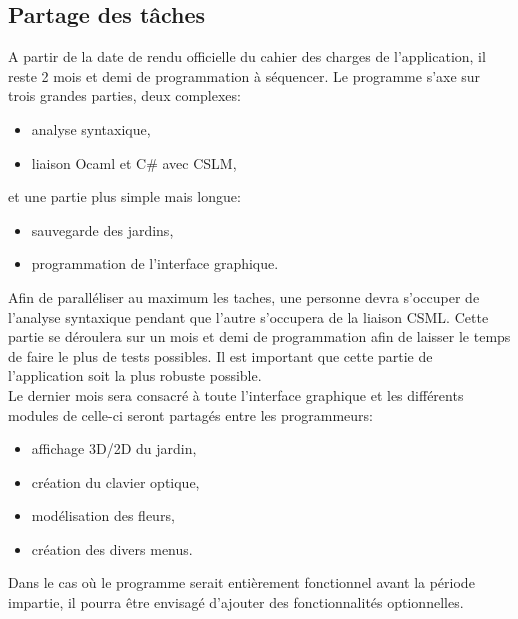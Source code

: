 \documentclass{article}
\theoremstyle{plain}
\theoremstyle{remark}
\begin{document}
\subsection{Partage des tâches}
A partir de la date de rendu officielle du cahier des charges de
l'application, il reste 2 mois et demi de programmation à séquencer.
\noindent
Le programme s'axe sur trois grandes parties, deux complexes:
\begin{itemize}
\item analyse syntaxique,
\item liaison Ocaml et C\# avec CSLM,
\end{itemize}
\noindent
et une partie plus simple mais longue:
\begin{itemize}
\item sauvegarde des jardins,
\item programmation de l'interface graphique.
\end{itemize}

Afin de paralléliser au maximum les taches, une personne devra
s'occuper de l'analyse syntaxique pendant que l'autre s'occupera de la
liaison CSML.  Cette partie se déroulera sur un mois et demi de
programmation afin de laisser le temps de faire le plus de tests
possibles. Il est important que cette partie de l'application soit la
plus robuste possible.\\ Le dernier mois sera consacré à toute
l'interface graphique et les différents modules de celle-ci seront
partagés entre les programmeurs:
\begin{itemize}
\item affichage 3D/2D du jardin,
\item création du clavier optique,
\item modélisation des fleurs,
\item création des divers menus.
\end{itemize}
\noindent
Dans le cas où le programme serait entièrement fonctionnel avant la
période impartie, il pourra être envisagé d'ajouter des
fonctionnalités optionnelles.
\end{document}
